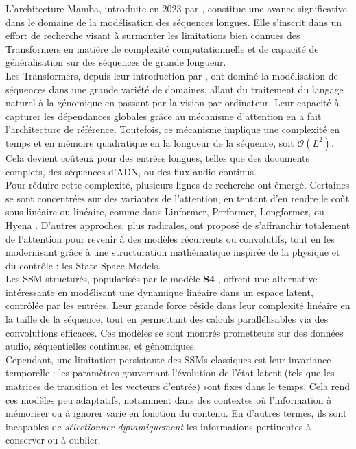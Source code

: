 L'architecture Mamba, introduite en 2023 par \citep{gu2023mamba}, constitue une avance significative dans le domaine de la modélisation des séquences longues. Elle s'inscrit dans un effort de recherche visant à surmonter les limitations bien connues des Transformers en matière de complexité computationnelle et de capacité de généralisation sur des séquences de grande longueur.\\

Les Transformers, depuis leur introduction par \citep{vaswani2017attention}, ont dominé la modélisation de séquences dans une grande variété de domaines, allant du traitement du langage naturel à la génomique en passant par la vision par ordinateur. Leur capacité à capturer les dépendances globales grâce au mécanisme d'attention en a fait l'architecture de référence. Toutefois, ce mécanisme implique une complexité en temps et en mémoire quadratique en la longueur de la séquence, soit \( \mathcal{O}(L^2) \). Cela devient coûteux pour des entrées longues, telles que des documents complets, des séquences d'ADN, ou des flux audio continus.\\

Pour réduire cette complexité, plusieurs lignes de recherche ont émergé. Certaines se sont concentrées sur des variantes de l'attention, en tentant d'en rendre le coût sous-linéaire ou linéaire, comme dans Linformer, Performer, Longformer, ou Hyena \citep{poli2023hyena}. D'autres approches, plus radicales, ont proposé de s'affranchir totalement de l'attention pour revenir à des modèles récurrents ou convolutifs, tout en les modernisant grâce à une structuration mathématique inspirée de la physique et du contrôle : les State Space Models.\\

Les SSM structurés, popularisés par le modèle \textbf{S4} \citep{sun2023retnet}, offrent une alternative intéressante en modélisant une dynamique linéaire dans un espace latent, contrôlée par les entrées. Leur grande force réside dans leur complexité linéaire en la taille de la séquence, tout en permettant des calculs parallélisables via des convolutions efficaces. Ces modèles se sont montrés prometteurs sur des données audio, séquentielles continues, et génomiques.\\

Cependant, une limitation persistante des SSMs classiques est leur invariance temporelle : les paramètres gouvernant l'évolution de l'état latent (tels que les matrices de transition et les vecteurs d'entrée) sont fixes dans le temps. Cela rend ces modèles peu adaptatifs, notamment dans des contextes où l'information à mémoriser ou à ignorer varie en fonction du contenu. En d'autres termes, ils sont incapables de \textit{sélectionner dynamiquement} les informations pertinentes à conserver ou à oublier.\\

